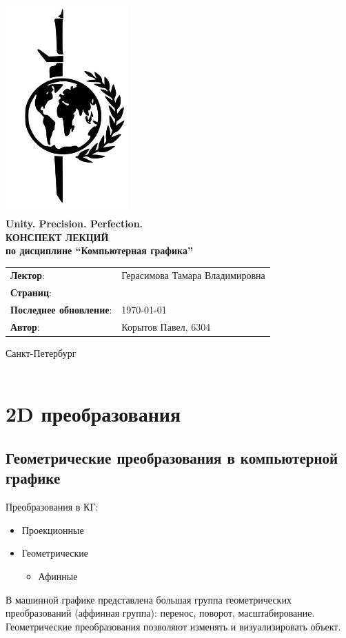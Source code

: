 \documentclass[a4paper, 14pt]{extarticle}
\begin{document}
	\begin{titlepage}
		{\centering
			{\bfseries
				\includegraphics[height=8cm]{logo.jpeg}\\
				Unity. Precision. Perfection.\\
				\vspace{3.5cm}
				\uppercase{Конспект лекций} \\
				по дисциплине \enquote{Компьютерная графика}\\
			}
			\vspace{\fill}
		}
		\begin{tabular}{l l}
			\textbf{Лектор}: & Герасимова Тамара Владимировна\\
			\textbf{Страниц}: & \pageref{LastPage}\\
			\textbf{Последнее обновление}: & \today{}\\ 
			\textbf{Автор}: & Корытов Павел, 6304\\
		\end{tabular}
	
		\vspace{2cm}
		{\centering
			Санкт-Петербург \\
			\the\year\\
		}
	\end{titlepage}

\tableofcontents
\newpage
\section{2D преобразования}
\subsection{Геометрические преобразования в	компьютерной графике}
Преобразования в КГ:
\begin{itemize}
	\item Проекционные
	\item Геометрические
	\begin{itemize}
		\item Афинные
	\end{itemize}
\end{itemize}
В машинной графике представлена большая группа геометрических преобразований (аффинная группа): перенос, поворот, масштабирование. Геометрические преобразования позволяют изменять и визуализировать объект.
\end{document}
